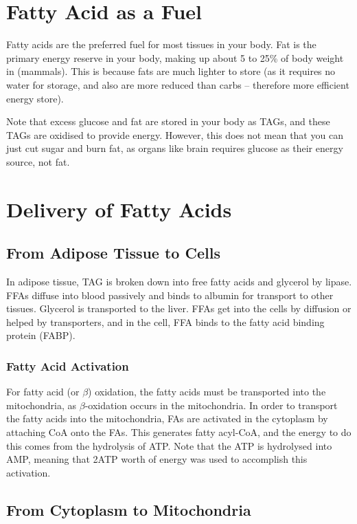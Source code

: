 \section{Fatty Acid as a Fuel}

Fatty acids are the preferred fuel for most tissues in your body.
Fat is the primary energy reserve in your body, making up about 5 to 25\% of body weight in (mammals).
This is because fats are much lighter to store (as it requires no water for storage, and also are more reduced than carbs -- therefore more efficient energy store).

Note that excess glucose and fat are stored in your body as TAGs, and these TAGs are oxidised to provide energy.
However, this does not mean that you can just cut sugar and burn fat, as organs like brain requires glucose as their energy source, not fat.

\section{Delivery of Fatty Acids}

\subsection{From Adipose Tissue to Cells}

In adipose tissue, TAG is broken down into free fatty acids and glycerol by lipase.
FFAs diffuse into blood passively and binds to albumin for transport to other tissues.
Glycerol is transported to the liver.
FFAs get into the cells by diffusion or helped by transporters, and in the cell, FFA binds to the fatty acid binding protein (FABP).

\subsubsection{Fatty Acid Activation}

For fatty acid (or $\beta$) oxidation, the fatty acids must be transported into the mitochondria, as $\beta$-oxidation occurs in the mitochondria.
In order to transport the fatty acids into the mitochondria, FAs are activated in the cytoplasm by attaching CoA onto the FAs.
This generates fatty acyl-CoA, and the energy to do this comes from the hydrolysis of ATP.
Note that the ATP is hydrolysed into AMP, meaning that 2ATP worth of energy was used to accomplish this activation.

\subsection{From Cytoplasm to Mitochondria}

